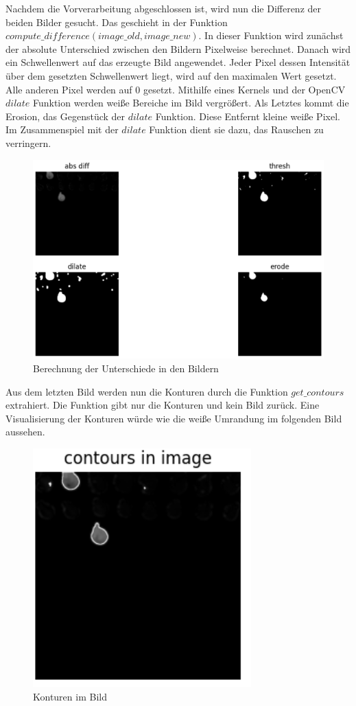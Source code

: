 Nachdem die Vorverarbeitung abgeschlossen ist, wird nun die Differenz der beiden Bilder gesucht.
Das geschieht in der Funktion \(compute\_difference(image\_old, image\_new)\). In dieser Funktion wird zunächst der absolute Unterschied zwischen den Bildern 
Pixelweise berechnet. Danach wird ein Schwellenwert auf das erzeugte Bild angewendet. Jeder Pixel dessen Intensität über dem gesetzten Schwellenwert liegt,
wird auf den maximalen Wert gesetzt. Alle anderen Pixel werden auf 0 gesetzt. 
Mithilfe eines Kernels und der OpenCV \(dilate\) Funktion werden weiße Bereiche im Bild vergrößert.
Als Letztes kommt die Erosion, das Gegenstück der \(dilate\) Funktion. Diese Entfernt kleine weiße Pixel. Im Zusammenspiel mit der \(dilate\) Funktion
dient sie dazu, das Rauschen zu verringern.

\begin{figure}[H]
    \centering
    \includegraphics[scale=0.4]{images/compute_difference.png}
    \caption{Berechnung der Unterschiede in den Bildern}
\end{figure} 

Aus dem letzten Bild werden nun die Konturen durch die Funktion \(get\_contours\) extrahiert.  
Die Funktion gibt nur die Konturen und kein Bild zurück. Eine Visualisierung der Konturen würde wie die weiße Umrandung im folgenden Bild aussehen.
\begin{figure}[H]
    \centering
    \includegraphics[scale=0.6]{images/contours_in_image.png}
    \caption{Konturen im Bild}
\end{figure} 

